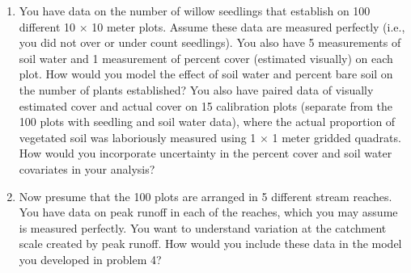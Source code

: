 \documentclass[12pt, oneside]{article}
\begin{document}
\begin{enumerate}[leftmargin=*]
\item You have data on the number of willow seedlings that establish on 100 different 10 $\times$ 10 meter plots. Assume these data are measured perfectly (i.e., you did not over or under count seedlings). You also have 5 measurements of soil water and 1 measurement of percent cover (estimated visually) on each plot.  How would you model the effect of soil water and percent bare soil on the number of plants established? You also have paired data of visually estimated cover and actual cover on 15 calibration plots (separate from the 100 plots with seedling and soil water data), where the actual proportion of vegetated soil was laboriously measured using 1 $\times$ 1 meter gridded quadrats.  How would you incorporate uncertainty in the percent cover and soil water covariates in your analysis?

\item Now presume that the 100 plots are arranged in 5 different stream reaches.  You have data on peak runoff in each of the reaches, which you may assume is measured perfectly. You want to understand variation at the catchment scale created by peak runoff.  How would you include these data in the model you developed in problem 4?


\end{enumerate}
\end{document}
